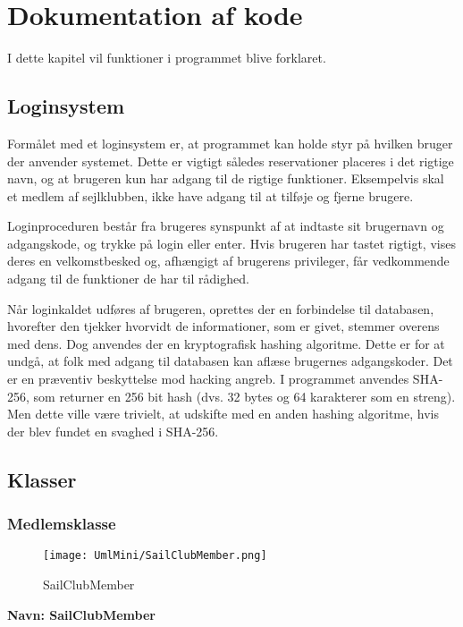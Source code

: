 \chapter{Dokumentation af kode} \label{chap:kode_docs}
I dette kapitel vil funktioner i programmet blive forklaret.

\section{Loginsystem} \label{sec:login}
Formålet med et loginsystem er, at programmet kan holde styr på hvilken bruger der anvender systemet. 
Dette er vigtigt således reservationer placeres i det rigtige navn, og at brugeren kun har adgang til de rigtige funktioner. 
Eksempelvis skal et medlem af sejlklubben, ikke have adgang til at tilføje og fjerne brugere. 

Loginproceduren består fra brugeres synspunkt af at indtaste sit brugernavn og adgangskode, og trykke på login eller enter. 
Hvis brugeren har tastet rigtigt, vises deres en velkomstbesked og, afhængigt af brugerens privileger, får vedkommende adgang til de funktioner de har til rådighed.

Når loginkaldet udføres af brugeren, oprettes der en forbindelse til databasen, hvorefter den tjekker hvorvidt de informationer, som er givet, stemmer overens med dens. 
Dog anvendes der en kryptografisk hashing algoritme. Dette er for at undgå, at folk med adgang til databasen kan aflæse brugernes adgangskoder.
Det er en præventiv beskyttelse mod hacking angreb.
I programmet anvendes SHA-256, som returner en 256 bit hash (dvs. 32 bytes og 64 karakterer som en streng). 
Men dette ville være trivielt, at udskifte med en anden hashing algoritme, hvis der blev fundet en svaghed i SHA-256. 


\section{Klasser}
\subsection*{Medlemsklasse}
\begin{wrapfigure}{l}{0.5\textwidth}
    \label{img:SailClubMember}
    \vspace{-20pt}
    \begin{center}
        \texttt{[image: UmlMini/SailClubMember.png]}
    \end{center}
    \vspace{-20pt}
    \caption{SailClubMember}
    \vspace{-10pt}
\end{wrapfigure}
\textbf{Navn: SailClubMember}

